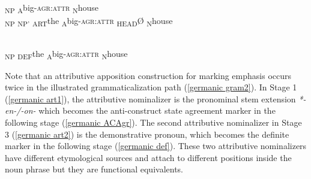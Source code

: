 {\newpage
\begin{exe}
\label{germanic gram2}
\begin{xlist}
\begin{xlist}
\\
{\ob}\textsubscript{\upshape NP} \textsubscript{\upshape A}big{\rm -\textsc{agr:attr}} \textsubscript{\upshape N}house{\cb}
\\
\label{germanic art2}
{\ob}\textsubscript{\upshape NP} {\ob}\textsubscript{\upshape NP'} \textsubscript{\upshape ART}the \textsubscript{\upshape A}big{\rm -\textsc{agr:attr}} \textsubscript{\upshape HEAD}{\rm Ø}{\cb} \textsubscript{\upshape N}house{\cb}
\end{xlist}
\begin{xlist}
\\
\label{germanic def}
{\ob}\textsubscript{\upshape NP} \textsubscript{\upshape DEF}the \textsubscript{\upshape A}big{\rm -\textsc{agr:attr}} \textsubscript{\upshape N}house{\cb}
\end{xlist}
\end{xlist}
\end{exe}

Note that an attributive apposition construction for marking emphasis occurs twice in the illustrated grammaticalization path (\ref{germanic gram2}). In Stage 1 (\ref{germanic art1}), the attributive nominalizer is the pronominal stem extension \textit{*-en-/-on-} which becomes the anti-construct state agreement marker in the following stage (\ref{germanic ACAgr}). The second attributive nominalizer in Stage 3 (\ref{germanic art2}) is the demonstrative pronoun, which becomes the definite marker in the following stage (\ref{germanic def}). These two attributive nominalizers have different etymological sources and attach to different positions inside the noun phrase but they are functional equivalents.

}
